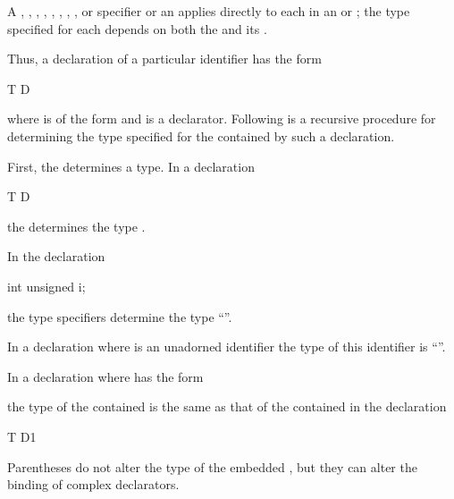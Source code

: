 \pnum
A
,
,
,
,
,
,
,
,
or
specifier
or an 
applies directly to each 
in an  or ;
the type specified for each  depends on
both the  and its .

\pnum
Thus, a declaration of a particular identifier has the form
\begin{codeblock}
T D
\end{codeblock}
where
is of the form 
and
is a declarator.
Following is a recursive procedure for determining
the type specified for the contained
by such a declaration.

\pnum
First, the
determines a type.
In a declaration
\begin{codeblock}
T D
\end{codeblock}
the
determines the type
.
\begin{example}
In the declaration
\begin{codeblock}
int unsigned i;
\end{codeblock}
the type specifiers
determine the type
``''.
\end{example}

\pnum
In a declaration
where
is an unadorned identifier the type of this identifier is
``''.

\pnum
In a declaration
where
has the form
\begin{ncsimplebnf}
\terminal{(}  \terminal{)}
\end{ncsimplebnf}
the type of the contained
is the same as that of the contained
in the declaration
\begin{codeblock}
T D1
\end{codeblock}
%
Parentheses do not alter the type of the embedded
,
but they can alter the binding of complex declarators.

